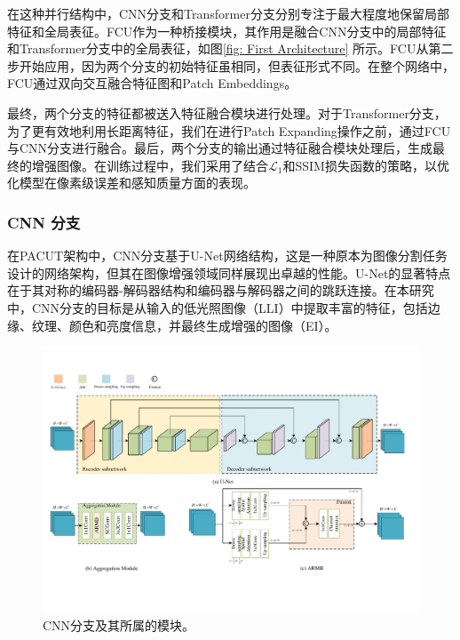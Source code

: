 \documentclass[a4paper]{ctexart}
\begin{document}
	在这种并行结构中，CNN分支和Transformer分支分别专注于最大程度地保留局部特征和全局表征。FCU作为一种桥接模块，其作用是融合CNN分支中的局部特征和Transformer分支中的全局表征，如图\ref{fig: First Architecture} 所示。FCU从第二步开始应用，因为两个分支的初始特征虽相同，但表征形式不同。在整个网络中，FCU通过双向交互融合特征图和Patch Embeddings。
	
	最终，两个分支的特征都被送入特征融合模块进行处理。对于Transformer分支，为了更有效地利用长距离特征，我们在进行Patch Expanding操作之前，通过FCU与CNN分支进行融合。最后，两个分支的输出通过特征融合模块处理后，生成最终的增强图像。在训练过程中，我们采用了结合$\mathcal{L}_1$和SSIM损失函数的策略，以优化模型在像素级误差和感知质量方面的表现。
	
	\subsubsection{CNN 分支}
	
	在PACUT架构中，CNN分支基于U-Net网络结构，这是一种原本为图像分割任务设计的网络架构，但其在图像增强领域同样展现出卓越的性能。U-Net的显著特点在于其对称的编码器-解码器结构和编码器与解码器之间的跳跃连接。在本研究中，CNN分支的目标是从输入的低光照图像（LLI）中提取丰富的特征，包括边缘、纹理、颜色和亮度信息，并最终生成增强的图像（EI）。
	
	\begin{figure}[htb]
		\centering 
		\setlength{\abovecaptionskip}{-1.5cm}
		\includegraphics[width=\columnwidth]{picture/LLIE/My Architecture/U-Net and AM}
			\caption{
				\label{fig: U-Net and AM} 
				CNN分支及其所属的模块。
			}
	\end{figure}
	
\end{document}
